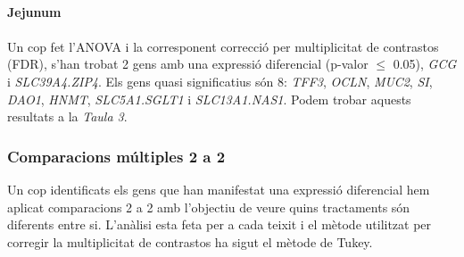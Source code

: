 \documentclass[english]{article}
\begin{document}
\\
\noindent\textbf{Jejunum}\\
\\
Un cop fet l'ANOVA i la corresponent correcció per multiplicitat de contrastos (FDR), s'han trobat 2 gens amb una expressió diferencial (p-valor $\leq$ 0.05), \textit{GCG} i \textit{SLC39A4.ZIP4}. Els gens quasi significatius són 8: \textit{TFF3}, \textit{OCLN}, \textit{MUC2}, \textit{SI}, \textit{DAO1}, \textit{HNMT}, \textit{SLC5A1.SGLT1} i \textit{SLC13A1.NAS1}. Podem trobar aquests resultats a la \textit{Taula 3}.\\

\clearpage
\subsubsection{Comparacions múltiples 2 a 2}
Un cop identificats els gens que han manifestat una expressió diferencial hem aplicat comparacions 2 a 2 amb l'objectiu de veure quins tractaments són diferents entre si. L'anàlisi esta feta per a cada teixit i el mètode utilitzat per corregir la multiplicitat de contrastos ha sigut el mètode de Tukey.
\begin{table}[ht]
\centering
{}
\caption{Dels gens significatius per al teixit \textbf{Ilenum}, s'apliquen comparacions 2 a 2 Gene-Tractament. A la taula només es mostren aquells p-valors quasi significatius o significatius.}
\end{table}
\end{document}
